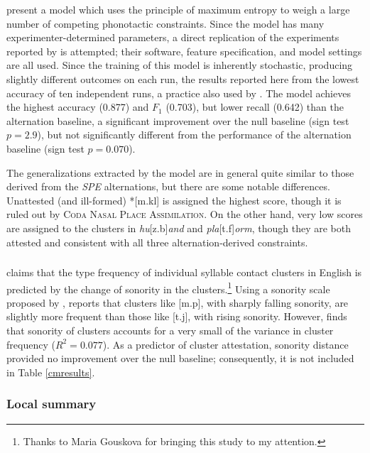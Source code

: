 \citet{Hayes2008a} present a model which uses the principle of maximum entropy to weigh a large number of competing phonotactic constraints. Since the model has many experimenter-determined parameters, a direct replication of the experiments reported by \citeauthor{Hayes2008a} is attempted; their software, feature specification, and model settings are all used. Since the training of this model is inherently stochastic, producing slightly different outcomes on each run, the results reported here from the lowest accuracy of ten independent runs, a practice also used by \citeauthor{Hayes2008a}. The model achieves the highest accuracy (0.877) and $F_1$ (0.703), but lower recall (0.642) than the alternation baseline, a significant improvement over the null baseline (sign test $p = 2.9$), but not significantly different from the performance of the alternation baseline (sign test $p = 0.070$). 

The generalizations extracted by the \citeauthor{Hayes2008a} model are in general quite similar to those derived from the \emph{SPE} alternations, but there are some notable differences. Unattested (and ill-formed) *[m.kl] is assigned the highest score, though it is ruled out by \textsc{Coda Nasal Place Assimilation}. On the other hand, very low scores are assigned to the clusters in \emph{hu}[z.b]\emph{and} and \emph{pla}[t.f]\emph{orm}, though they are both attested and consistent with all three alternation-derived constraints. 

\subsubsection{\citealt{McGowan2009}}

\citet{McGowan2009} claims that the type frequency of individual syllable contact clusters in English is predicted by the change of sonority in the clusters.\footnote{Thanks to Maria Gouskova for bringing this study to my attention.} Using a sonority scale proposed by \citet{Jespersen1904}, \citeauthor{McGowan2009} reports that clusters like [m.p], with sharply falling sonority, are slightly more frequent than those like [t.j], with rising sonority. However, \citeauthor{McGowan2009} finds that sonority of clusters accounts for a very small of the variance in cluster frequency ($R^2 = 0.077$). As a predictor of cluster attestation, sonority distance provided no improvement over the null baseline; consequently, it is not included in Table \ref{cmresults}.

\subsubsection{Local summary}


